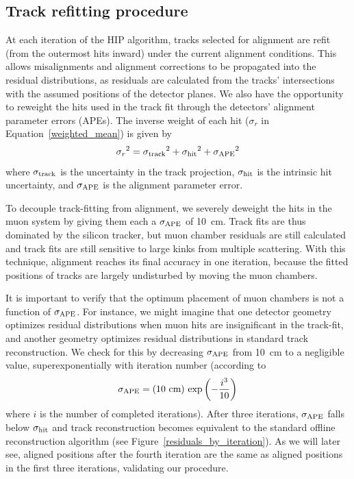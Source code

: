 \documentclass[12pt]{article}
\begin{document}
\subsection{Track refitting procedure}

At each iteration of the HIP algorithm, tracks selected for alignment
are refit (from the outermost hits inward) under the current alignment
conditions.  This allows misalignments and alignment corrections to be
propagated into the residual distributions, as residuals are
calculated from the tracks' intersections with the assumed positions of
the detector planes.  We also have the opportunity to reweight the
hits used in the track fit through the detectors' alignment parameter
errors (APEs).  The inverse weight of each hit ($\sigma_r$ in
Equation~\ref{weighted_mean}) is given by
\begin{equation}
{\sigma_r}^2 = {\sigma_{\mbox{\scriptsize track}}}^2 +
{\sigma_{\mbox{\scriptsize hit}}}^2 + {\sigma_{\mbox{\scriptsize APE}}}^2
\label{hit_uncertainty}
\end{equation}
where $\sigma_{\mbox{\scriptsize track}}$ is the uncertainty in the
track projection, $\sigma_{\mbox{\scriptsize hit}}$ is the intrinsic
hit uncertainty, and $\sigma_{\mbox{\scriptsize APE}}$ is the
alignment parameter error.

To decouple track-fitting from alignment, we severely deweight the
hits in the muon system by giving them each a
$\sigma_{\mbox{\scriptsize APE}}$ of 10~cm.  Track fits are thus
dominated by the silicon tracker, but muon chamber residuals are still
calculated and track fits are still sensitive to large kinks from
multiple scattering.  With this technique, alignment reaches its final
accuracy in one iteration, because the fitted positions of tracks are
largely undisturbed by moving the muon chambers.

It is important to verify that the optimum placement of muon chambers
is not a function of $\sigma_{\mbox{\scriptsize APE}}$.  For instance,
we might imagine that one detector geometry optimizes residual
distributions when muon hits are insignificant in the track-fit, and
another geometry optimizes residual distributions in standard track
reconstruction.  We check for this by decreasing
$\sigma_{\mbox{\scriptsize APE}}$ from 10~cm to a negligible value,
superexponentially with iteration number (according to
\begin{equation}
\sigma_{\mbox{\scriptsize APE}} = (10\mbox{ cm}) \, \exp\left(-\frac{i^3}{10}\right)
\end{equation}
where $i$ is the number of completed iterations).
After three iterations, $\sigma_{\mbox{\scriptsize APE}}$ falls
below $\sigma_{\mbox{\scriptsize hit}}$ and track reconstruction
becomes equivalent to the standard offline reconstruction algorithm
(see Figure~\ref{residuals_by_iteration}).  As we will later see,
aligned positions after the fourth iteration are the same as aligned
positions in the first three iterations, validating our procedure.
\end{document}
